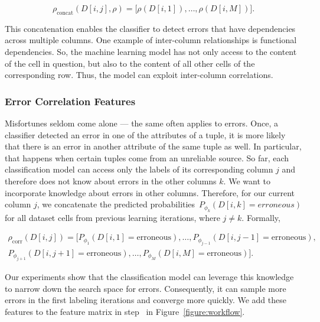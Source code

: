 \begin{equation} \label{equation:feature_concat}
\rho_{\text{concat}}(D[i,j], \rho) = \Big[\rho(D[i,1]), \dots, \rho(D[i,M])\Big].
\end{equation}

This concatenation enables the classifier to detect errors that have dependencies across multiple columns. One example of inter-column relationships is functional dependencies. 
So, the machine learning model has not only access to the content of the cell in question, but also to the content of all other cells of the corresponding row. Thus, the model can exploit inter-column correlations. 

\subsubsection{Error Correlation Features}
\label{sec:error_correlation_features}
Misfortunes seldom come alone --- the same often applies to errors. Once, a classifier detected an error in one of the attributes of a tuple, it is more likely that there is an error in another attribute of the same tuple as well.
In particular, that happens when certain tuples come from an unreliable source.
So far, each classification model can access only the labels of its corresponding column $j$ and therefore does not know about errors in the other columns $k$.
 We want to incorporate knowledge about errors in other columns. Therefore, for our current column $j$, we concatenate the predicted probabilities~$P_{\phi_{k}}(D[i, k] = erroneous)$ for all dataset cells from previous learning iterations, where $j\neq k$. Formally,

\begin{scriptsize}
\begin{equation} \label{equation:feature_errorcorrelation}
\begin{split}
\rho_{\text{corr}}(D[i,j]) = \Big[P_{\phi_{1}}(D[i, 1] = \text{erroneous}), \dots , P_{\phi_{j-1}}(D[i, j-1] = \text{erroneous}), \\ 
P_{\phi_{j+1}}(D[i, j+1] = \text{erroneous}) , \dots , P_{\phi_{M}}(D[i, M] = \text{erroneous})\Big].
\end{split}
\end{equation}
\end{scriptsize}

Our experiments show that the classification model can leverage this knowledge to narrow down the search space for errors. Consequently, it can sample more errors in the first labeling iterations and converge more quickly. We add these features to the feature matrix in step~ in Figure~\ref{figure:workflow}.


